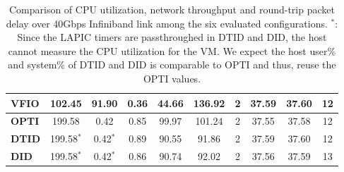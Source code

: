 \begin{table*}[t]
{\begin{tabular}{|l|c|c|c|c|c|c|c|c|c|}
\textbf{VFIO}       & 102.45          & 91.90             & 0.36            & 44.66             & 136.92                                & 2                                  & 37.59                                                              & 37.60                                                             & 12                                                              \\ \hline
\textbf{OPTI}       & 199.58          & 0.42              & 0.85            & 99.97             & 101.24                                & 2                                  & 37.55                                                              & 37.58                                                             & 12                                                              \\ \hline
\textbf{DTID}       & 199.58$^*$      & 0.42$^*$          & 0.89            & 90.55             & 91.86                                 & 2                                  & 37.59                                                              & 37.60                                                             & 12                                                              \\ \hline
\textbf{DID}        & 199.58$^*$      & 0.42$^*$          & 0.86            & 90.74             & 92.02                                 & 2                                  & 37.56                                                              & 37.59                                                             & 13                                                              \\ \hline
\end{tabular}%
}
\caption{Comparison of CPU utilization, network throughput and
round-trip packet delay over 40Gbps Infiniband link among the
six evaluated configurations. $^*$: Since the LAPIC timers are
passthroughed in DTID and DID, the host cannot measure the CPU
utilization for the VM. We expect the host user\% and system\%
of DTID and DID is comparable to OPTI and thus, reuse the OPTI
values.}
\label{tab:cpu_network_io}
\end{table*}

